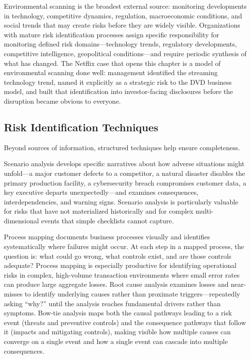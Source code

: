 \documentclass[11pt,openany]{book}
\begin{document}
Environmental scanning is the broadest external source: monitoring developments in technology, competitive dynamics, regulation, macroeconomic conditions, and social trends that may create risks before they are widely visible. Organizations with mature risk identification processes assign specific responsibility for monitoring defined risk domains---technology trends, regulatory developments, competitive intelligence, geopolitical conditions---and require periodic synthesis of what has changed. The Netflix case that opens this chapter is a model of environmental scanning done well: management identified the streaming technology trend, named it explicitly as a strategic risk to the DVD business model, and built that identification into investor-facing disclosures before the disruption became obvious to everyone.

\subsection{Risk Identification Techniques}
\label{subsec:identification-techniques}

Beyond sources of information, structured techniques help ensure completeness.

Scenario analysis develops specific narratives about how adverse situations might unfold---a major customer defects to a competitor, a natural disaster disables the primary production facility, a cybersecurity breach compromises customer data, a key executive departs unexpectedly---and examines consequences, interdependencies, and warning signs. Scenario analysis is particularly valuable for risks that have not materialized historically and for complex multi-dimensional events that simple checklists cannot capture.

Process mapping documents business processes visually and identifies systematically where failures might occur. At each step in a mapped process, the question is: what could go wrong, what controls exist, and are those controls adequate? Process mapping is especially productive for identifying operational risks in complex, high-volume transaction environments where small error rates can produce large aggregate losses. Root cause analysis examines losses and near-misses to identify underlying causes rather than proximate triggers---repeatedly asking ``why?'' until the analysis reaches fundamental drivers rather than symptoms. Bow-tie analysis maps both the causal pathways leading to a risk event (threats and preventive controls) and the consequence pathways that follow it (impacts and mitigating controls), making visible how multiple causes can converge on a single event and how a single event can cascade into multiple consequences.
\end{document}
